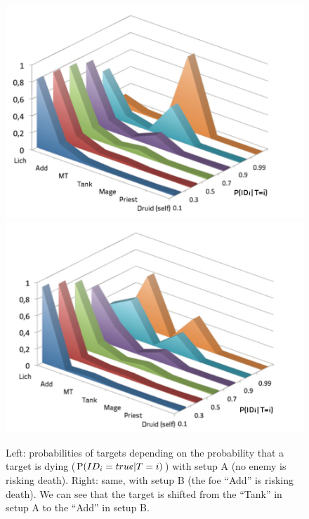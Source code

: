 \begin{figure}[h!]
\begin{center}
\includegraphics[width=0.496\columnwidth]{images/wow_distrib_target1.png} \includegraphics[width=0.496\columnwidth]{images/wow_distrib_target2.png}
\caption{Left: probabilities of targets depending on the probability that a target is dying ($\mathrm{P}(ID_i=true | T=i)$) with setup A (no enemy is risking death). Right: same, with setup B (the foe ``Add'' is risking death). We can see that the target is shifted from the ``Tank'' in setup A to the ``Add'' in setup B.}
\label{fig:wow_target}
\end{center}
\end{figure}
